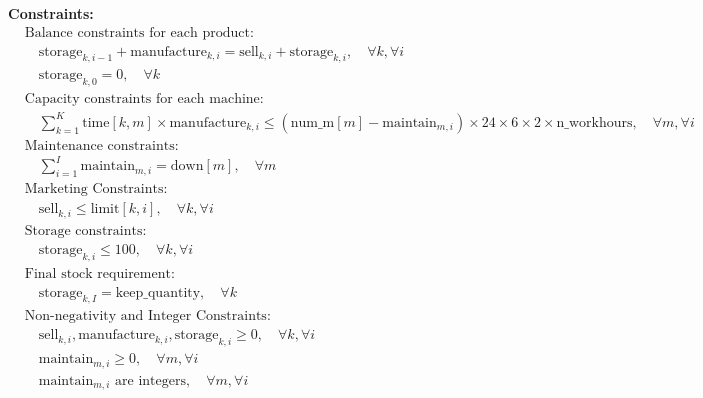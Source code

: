 \documentclass{article}
\begin{document}
\textbf{Constraints:}
\begin{align*}
& \text{Balance constraints for each product:} \\
& \quad \text{storage}_{k, i-1} + \text{manufacture}_{k, i} = \text{sell}_{k, i} + \text{storage}_{k, i}, \quad \forall k, \forall i \\
& \quad \text{storage}_{k, 0} = 0, \quad \forall k \\

& \text{Capacity constraints for each machine:} \\
& \quad \sum_{k=1}^{K} \text{time}[k, m] \times \text{manufacture}_{k, i} \leq (\text{num\_m}[m] - \text{maintain}_{m, i}) \times 24 \times 6 \times 2 \times \text{n\_workhours}, \quad \forall m, \forall i \\

& \text{Maintenance constraints:} \\
& \quad \sum_{i=1}^{I} \text{maintain}_{m, i} = \text{down}[m], \quad \forall m \\

& \text{Marketing Constraints:} \\
& \quad \text{sell}_{k, i} \leq \text{limit}[k, i], \quad \forall k, \forall i \\

& \text{Storage constraints:} \\
& \quad \text{storage}_{k, i} \leq 100, \quad \forall k, \forall i \\

& \text{Final stock requirement:} \\
& \quad \text{storage}_{k, I} = \text{keep\_quantity}, \quad \forall k \\

& \text{Non-negativity and Integer Constraints:} \\
& \quad \text{sell}_{k, i}, \text{manufacture}_{k, i}, \text{storage}_{k, i} \geq 0, \quad \forall k, \forall i \\
& \quad \text{maintain}_{m, i} \geq 0, \quad \forall m, \forall i \\
& \quad \text{maintain}_{m, i} \text{ are integers}, \quad \forall m, \forall i
\end{align*}
\end{document}
